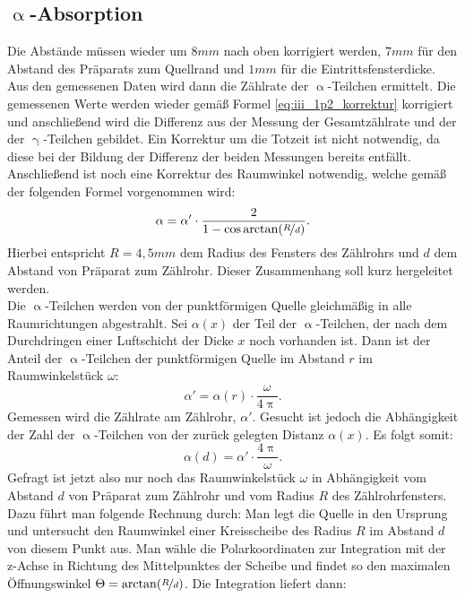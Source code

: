 \subsection{\texorpdfstring{$\upalpha$}{Alpha}-Absorption}
Die Abstände müssen wieder um $\si{8}{mm}$ nach oben korrigiert werden, $\si{7}{mm}$ für den Abstand des Präparats zum Quellrand und $\si{1}{mm}$ für die Eintrittsfensterdicke. Aus den gemessenen Daten wird dann die Zählrate der $\upalpha$-Teilchen ermittelt. Die gemessenen Werte werden wieder gemäß Formel \eqref{eq:iii_1p2_korrektur} korrigiert und anschließend wird die Differenz aus der Messung der Gesamtzählrate und der der $\upgamma$-Teilchen gebildet. Ein Korrektur um die Totzeit ist nicht notwendig, da diese bei der Bildung der Differenz der beiden Messungen bereits entfällt. Anschließend ist noch eine Korrektur des Raumwinkel notwendig, welche gemäß der folgenden Formel vorgenommen wird:
\begin{equation}
\alpha = \alpha' \cdot \frac{2}{1-\cos\arctan(\nicefrac{R}{d})}.\label{eq:iii_2_winkel}
\end{equation}
Hierbei entspricht $R = \si{4,5}{mm}$ dem Radius des Fensters des Zählrohrs und $d$ dem Abstand von Präparat zum Zählrohr. Dieser Zusammenhang soll kurz hergeleitet werden.\\
Die $\upalpha$-Teilchen werden von der punktförmigen Quelle gleichmäßig in alle Raumrichtungen abgestrahlt. Sei $\alpha(x)$ der Teil der $\upalpha$-Teilchen, der nach dem Durchdringen einer Luftschicht der Dicke $x$ noch vorhanden ist. Dann ist der Anteil der $\upalpha$-Teilchen der punktförmigen Quelle im Abstand $r$ im Raumwinkelstück $\omega$:
\begin{equation}
\alpha' = \alpha(r) \cdot \frac{\omega}{4 \uppi}.\label{eq:iii_2_abh}
\end{equation}
Gemessen wird die Zählrate am Zählrohr, $\alpha'$. Gesucht ist jedoch die Abhängigkeit der Zahl der $\upalpha$-Teilchen von der zurück gelegten Distanz $\alpha(x)$. Es folgt somit:
\begin{equation}
\alpha(d) = \alpha' \cdot \frac{4\uppi}{\omega}.
\end{equation}
Gefragt ist jetzt also nur noch das Raumwinkelstück $\omega$ in Abhängigkeit vom Abstand $d$ von Präparat zum Zählrohr und vom Radius $R$ des Zählrohrfensters.\\
Dazu führt man folgende Rechnung durch: Man legt die Quelle in den Ursprung und untersucht den Raumwinkel einer Kreisscheibe des Radius $R$ im Abstand $d$ von diesem Punkt aus. Man wähle die Polarkoordinaten zur Integration mit der z-Achse in Richtung des Mittelpunktes der Scheibe und findet so den maximalen Öffnungswinkel $\Theta = \arctan(\nicefrac{R}{d})$. Die Integration liefert dann:
